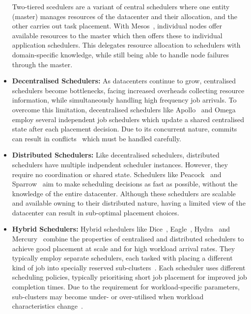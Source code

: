 \begin{itemize}
        Two-tiered scedulers are a variant of central schedulers where one
        entity (master) manages resources of the datacenter and their
        allocation, and the other carries out task placement. With
        Mesos~\cite{60}, individual nodes offer available resources to the
        master which then offers these to individual application schedulers.
        This delegates resource allocation to schedulers with domain-specific
        knowledge, while still being able to handle node failures through the
        master.
    \item \textbf{Decentralised Schedulers:} As datacenters continue to grow,
        centralised schedulers become bottlenecks, facing increased overheads
        collecting resource information, while simultaneously handling high
        frequency job arrivals. To overcome this limitation, decentralised
        schedulers like Apollo~\cite{} and Omega~\cite{} employ several
        independent job schedulers which update a shared centralised state after
        each placement decision. Due to its concurrent nature, commits can
        result in conflicts~\cite{101} which must be handled carefully.
    \item \textbf{Distributed Schedulers:} Like decentralised schedulers,
        distributed schedulers have multiple indpendent scheduler instances.
        However, they require no coordination or shared state. Schedulers like
        Peacock~\cite{73} and Sparrow~\cite{90} aim to make scheduling decisions
        as fast as possible, without the knowledge of the entire datacenter.
        Although these schedulers are scalable and available owning to their
        distributed nature, having a limited view of the datacenter can result
        in sub-optimal placement choices.
    \item \textbf{Hybrid Schedulers:} Hybrid schedulers like Dice~\cite{130},
        Eagle~\cite{31}, Hydra~\cite{44} and Mercury~\cite{71} combine the properties of
        centralised and distributed schedulers to achieve good placement at
        scale and for high workload arrival rates. They typically employ
        separate schedulers, each tasked with placing a different kind of job
        into specially reserved sub-clusters~\cite{31,33,71,123}. Each scheduler
        uses different scheduling policies, typically prioritising short job
        placement for improved job completion times. Due to the requirement for
        workload-specific parameters, sub-clusters may become under- or
        over-utilised when workload characteristics change~\cite{46}.
\end{itemize}

